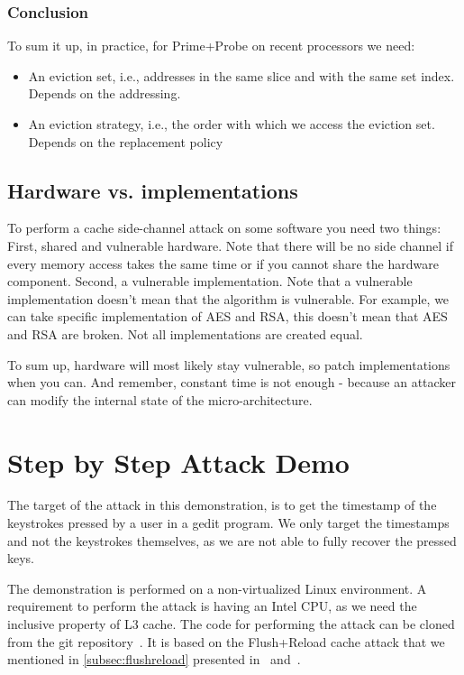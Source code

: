 \subsubsection{Conclusion}
\label{subsubsec:Conclusion}
To sum it up, in practice, for Prime+Probe on recent processors we need:
\begin{itemize}
    \item An eviction set, i.e., addresses in the same slice and with the same set index. Depends on the addressing.
    \item An eviction strategy, i.e., the order with which we access the eviction set. Depends on the replacement policy
\end{itemize}

\subsection{Hardware vs. implementations}
\label{subsec:Hardwarevsimplementations}

To perform a cache side-channel attack on some software you need two things: First, shared and vulnerable hardware. Note that there will be no side channel if every memory access takes the same time or if you cannot share the hardware component. Second, a vulnerable implementation. Note that a vulnerable implementation doesn't mean that the algorithm is vulnerable. For example, we can take specific implementation of AES and RSA, this doesn't mean that AES and RSA are broken. Not all implementations are created equal.

To sum up, hardware will most likely stay vulnerable, so patch implementations when you can. And remember, constant time is not enough - because an attacker can modify the internal state of the micro-architecture.

\section{Step by Step Attack Demo} %
\label{sec:stepbystepattack}

The target of the attack in this demonstration, is to get the timestamp of the keystrokes pressed by a user in a gedit program. We only target the timestamps and not the keystrokes themselves, as we are not able to fully recover the pressed keys.

The demonstration is performed on a non-virtualized Linux environment. A requirement to perform the attack is having an Intel CPU, as we need the inclusive property of L3 cache. The code for performing the attack can be cloned from the git repository~\cite{GitClementine}. It is based on the Flush+Reload cache attack that we mentioned in \cref{subsec:flushreload} presented in~\cite{Yarom2014} and~\cite{Gruss2015}.

